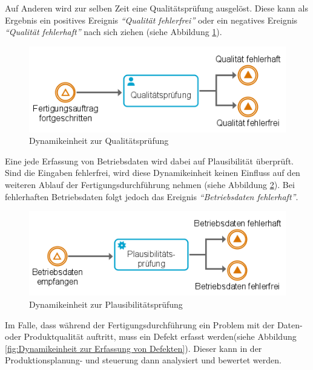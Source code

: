 Auf Anderen wird zur selben Zeit eine Qualitätsprüfung ausgelöst. Diese kann als Ergebnis ein positives Ereignis \textit{\enquote{Qualität fehlerfrei}} oder ein negatives Ereignis \textit{\enquote{Qualität fehlerhaft}} nach sich ziehen (siehe Abbildung \ref{fig:Dynamikeinheit zur Qualitätsprüfung}).

\begin{figure}[H]
	\centering 
    \includegraphics[width=.7\textwidth]{img/qualiit.png}	
    \caption[Dynamikeinheit zur Qualitätsprüfung]
    {Dynamikeinheit zur Qualitätsprüfung\protect\footnotemark}
    \label{fig:Dynamikeinheit zur Qualitätsprüfung}
\end{figure}

Eine jede Erfassung von Betriebsdaten wird dabei auf Plausibilität überprüft. Sind die Eingaben fehlerfrei, wird diese Dynamikeinheit keinen Einfluss auf den weiteren Ablauf der Fertigungsdurchführung nehmen (siehe Abbildung \ref{fig:Dynamikeinheit zur Plausibilitätsprüfung}).
Bei fehlerhaften Betriebsdaten folgt jedoch das Ereignis \textit{\enquote{Betriebsdaten fehlerhaft}}.

\begin{figure}[H]
	\centering 
    \includegraphics[width=.7\textwidth]{img/plausibilit.png}	
    \caption[Dynamikeinheit zur Plausibilitätsprüfung]
    {Dynamikeinheit zur Plausibilitätsprüfung\protect\footnotemark}
    \label{fig:Dynamikeinheit zur Plausibilitätsprüfung}
\end{figure}

Im Falle, dass während der Fertigungsdurchführung ein Problem mit der Daten- oder Produktqualität auftritt, muss ein Defekt erfasst werden(siehe Abbildung \ref{fig:Dynamikeinheit zur Erfassung von Defekten}). Dieser kann in der Produktionsplanung- und steuerung dann analysiert und bewertet werden.

